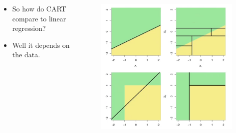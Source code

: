 \documentclass[aspectratio=169,10pt]{beamer}
\begin{document}
\begin{frame}{\secname}{\subsecname}
  \begin{columns}
    \begin{column}{.5\textwidth}
      \begin{itemize}
        \item So how do CART compare to linear regression?
        \item Well it depends on the data.
      \end{itemize}
    \end{column}
    \begin{column}{.5\textwidth}
      \begin{figure}
        \includegraphics[width=.9\textwidth]{scripts/output/types-of-data.png}
      \end{figure}
    \end{column}
  \end{columns}
\end{frame}
\end{document}
